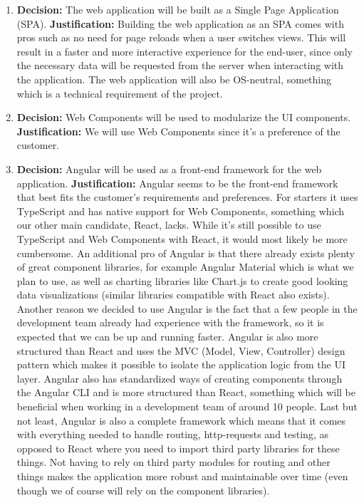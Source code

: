 \documentclass{article}
\begin{document}
\begin{enumerate}
    \item \textbf{Decision:} The web application will be built as a Single Page Application (SPA).
        \linebreak{}
        \textbf{Justification:} Building the web application as an SPA comes with pros such as no need for page reloads when a user switches views. This will result in a faster and more interactive experience for the end-user, since only the necessary data will be requested from the server when interacting with the application. The web application will also be OS-neutral, something which is a technical requirement of the project.
        
    \item \textbf{Decision:} Web Components will be used to modularize the UI components.  
    \linebreak{}
    \textbf{Justification:} We will use Web Components since it's a preference of the customer.
    
    \item \textbf{Decision:} Angular will be used as a front-end framework for the web application.
    \linebreak{}
    \textbf{Justification:} Angular seems to be the front-end framework that best fits the customer's requirements and preferences. For starters it uses TypeScript and has native support for Web Components, something which our other main candidate, React, lacks. While it's still possible to use TypeScript and Web Components with React, it would most likely be more cumbersome. An additional pro of Angular is that there already exists plenty of great component libraries, for example Angular Material which is what we plan to use, as well as charting libraries like Chart.js to create good looking data visualizations (similar libraries compatible with React also exists). Another reason we decided to use Angular is the fact that a few people in the development team already had experience with the framework, so it is expected that we can be up and running faster. Angular is also more structured than React and uses the MVC (Model, View, Controller) design pattern which makes it possible to isolate the application logic from the UI layer.
    Angular also has standardized ways of creating components through the Angular CLI and is more structured than React, something which will be beneficial when working in a development team of around 10 people. Last but not least, Angular is also a complete framework which means that it comes with everything needed to handle routing, http-requests and testing, as opposed to React where you need to import third party libraries for these things. Not having to rely on third party modules for routing and other things makes the application more robust and maintainable over time (even though we of course will rely on the component libraries). 
    

\end{enumerate}
\end{document}
